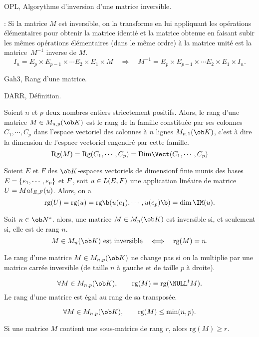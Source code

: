 \Subsection OPL, Algorythme d'inversion d'une matrice inversible.

\Remarque : Si la matrice $M$ est inversible, on la transforme en lui appliquant les op\'erations \'el\'ementaires pour obtenir la matrice identi\'e et la matrice obtenue en faisant subir les m\^emes op\'erations \'el\'ementaires (dans le m\^eme ordre) \`a la matrice unit\'e est la matrice~$M^{-1}$ inverse de $M$. 
$$
I_n=E_p\times E_{p-1}\times\cdots E_2\times E_1\times M\quad\Longrightarrow\quad M^{-1}=E_p\times E_{p-1}\times\cdots E_2\times E_1\times I_n.
$$


\Section Gah3, Rang d'une matrice. 


\Subsection DARR, D\'efinition. 

\Definition []  Soient $n$ et $p$ deux nombres entiers stricetement positifs. Alors, le rang d'une matrice $M\in\sc M_{n,p}(\ob K)$ est le rang de la famille constitu\'ee par ses colonnes $C_1, \cdots, C_p$ dans l'espace vectoriel des colonnes \`a $n$ lignes $\sc M_{n,1}(\ob K)$, c'est \`a dire la dimension de l'espace vectoriel engendr\'e par cette famille.
$$
\mbox{Rg}(M)=\mbox{Rg}(C_1,\cdots, C_p)=\mbox{Dim}\Vect(C_1,\cdots, C_p) 
$$

\Propriete []  Soient $E$ et $F$ des $\ob K$-espaces vectoriels de dimensionf finie munis des bases $\sc E=\{e_1,\cdots,e_p\}$ et $\sc F$, 
soit $u\in\sc L(E,F)$ une application lin\'eaire de matrice $U=\sc Mat_{\sc E,\sc F}(u)$. Alors, on a 
$$
\mbox{rg}(U)=\mbox{rg}(u)=\mbox{rg}\b(u(e_1),\cdots, u(e_p)\b)=\dim\IM(u).
$$

\Propriete []  Soit $n\in\ob N^*$. alors, une matrice $M\in\sc M_n(\ob K)$ est inversible si, et seulement si, elle est de rang $n$. 
$$
M\in\sc M_n(\ob K)\mbox{ est inversible}\quad\Longleftrightarrow\quad \mbox{rg}(M)=n. 
$$

\Propriete []  Le rang d'une matrice $M\in\sc M_{n,p}(\ob K)$ ne change pas si on la multiplie par une matrice carr\'ee inversible (de taille $n$ \`a gauche et de taille $p$ \`a droite). 
\bigskip

$$
\forall M\in\sc M_{n,p}(\ob K), \qquad \mbox{rg}(M)=\mbox{rg}(\NULL^tM).
$$
Le rang d'une matrice est \'egal au rang de sa transpos\'ee.

$$
\forall M\in\sc M_{n,p}(\ob K),\qquad \mbox{rg}(M)\le \min(n,p).
$$

\Propriete []  Si une matrice $M$ contient une sous-matrice de rang $r$, alors $\mbox{rg}(M)\ge r$. 
\bigskip

